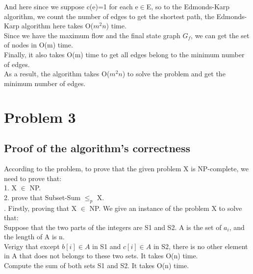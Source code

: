 \documentclass[]{article}
\begin{document}
	\noindent And here since we suppose c(e)=1 for each e$\in$E, so to the Edmonds-Karp algorithm, we count the number of edges to get the shortest path, the Edmonds-Karp algorithm here takes O($m^{2}n$) time.   \\
	
	\noindent Since we have the maximum flow and the final state graph $G_{f}$, we can get the set of nodes in O(m) time.   \\
	
	\noindent Finally, it also takes O(m) time to get all edges belong to the minimum number of edges.  \\
	
	\noindent As a result, the algorithm takes O($m^{2}n$) to solve the problem and get the minimum number of edges.   \\
	
	\clearpage
	
	\section{Problem 3}
	
	\subsection{Proof of the algorithm's correctness}
	
	\noindent According to the problem, to prove that the given problem X is NP-complete, we need to prove that:  \\
	
	1. X $\in$ NP.\\
	
	2. prove that Subset-Sum $\leq_{p}$ X.  \\
	
	. Firstly, proving that X $\in$ NP. We give an instance of the problem X to solve that: \\

	Suppose that the two parts of the integers are S1 and S2. A is the set of $a_{i}$, and the length of A is n. \\
	
	Verigy that except $b[i] \in A$ in S1 and $c[i] \in A$ in S2, there is no other element in A that does not belongs to these two sets. It takes O(n) time. \\
	
	Compute the sum of both sets S1 and S2. It takes O(n) time.  \\
	
\end{document}
